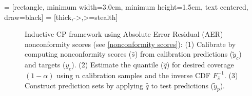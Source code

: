 \usepackage{tikz}
\usetikzlibrary{shapes.geometric, arrows}

 = [rectangle, minimum width=3.0cm, minimum height=1.5cm, text centered, draw=black]
 = [thick,->,>=stealth]

\begin{figure}
\centering
{}
\caption{Inductive CP framework using Absolute Error Residual (AER) nonconformity scores (see \cref{nonconformity scores}): (1) Calibrate by computing nonconformity scores ($\hat{s}$) from calibration predictions ($\tilde{y}_c$) and targets ($y_c$). (2) Estimate the quantile ($\hat{q}$) for desired coverage $(1-\alpha)$ using $n$ calibration samples and the inverse CDF $F_{\hat{s}}^{-1}$. (3) Construct prediction sets by applying $\hat{q}$ to test predictions ($\tilde{y}_p$).}
\label{fig: cp_framework_tikz}
\end{figure}
    